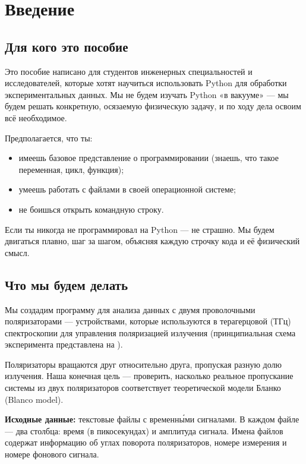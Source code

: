 	\section*{Введение}

\subsection*{Для кого это пособие}

Это пособие написано для студентов инженерных специальностей и исследователей,
которые хотят научиться использовать Python для обработки экспериментальных
данных. Мы не будем изучать Python «в вакууме» — мы будем решать конкретную,
осязаемую физическую задачу, и по ходу дела освоим всё необходимое.

Предполагается, что ты:
\begin{itemize}
	\item имеешь базовое представление о программировании (знаешь, что такое
	переменная, цикл, функция);
	\item умеешь работать с файлами в своей операционной системе;
	\item не боишься открыть командную строку.
\end{itemize}

Если ты никогда не программировал на Python — не страшно. Мы будем двигаться плавно, 
шаг за шагом, объясняя каждую строчку кода и её физический смысл.

\subsection*{Что мы будем делать}

Мы создадим программу для анализа данных с двумя проволочными поляризаторами —
устройствами, которые используются в терагерцовой (ТГц) спектроскопии для управления
поляризацией излучения (принципиальная схема эксперимента представлена на ).


Поляризаторы вращаются друг относительно друга, пропуская разную долю излучения.
Наша конечная цель — проверить, насколько реальное пропускание системы из двух поляризаторов
соответствует теоретической модели Бланко (Blanco model).

\textbf{Исходные данные:} текстовые файлы с временны́ми сигналами.
В каждом файле — два столбца: время (в пикосекундах) и амплитуда сигнала.
Имена файлов содержат информацию об углах поворота поляризаторов,
номере измерения и номере фонового сигнала.

